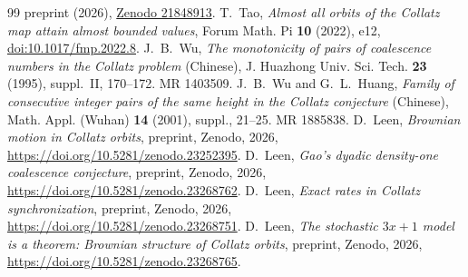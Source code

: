 \documentclass[11pt]{amsart}
\theoremstyle{definition}
\theoremstyle{remark}
\begin{document}
\begin{thebibliography}{99}
preprint (2026), \href{https://zenodo.org/records/21848913}{Zenodo 21848913}.
T.~Tao, \emph{Almost all orbits of the Collatz map attain almost bounded values},
Forum Math. Pi \textbf{10} (2022), e12,
\href{https://doi.org/10.1017/fmp.2022.8}{doi:10.1017/fmp.2022.8}.
J.~B.~Wu, \emph{The monotonicity of pairs of coalescence numbers in the Collatz problem} (Chinese),
J. Huazhong Univ. Sci. Tech. \textbf{23} (1995), suppl.~II, 170--172. MR 1403509.
J.~B.~Wu and G.~L.~Huang, \emph{Family of consecutive integer pairs of the same height in the Collatz conjecture} (Chinese),
Math. Appl. (Wuhan) \textbf{14} (2001), suppl., 21--25. MR 1885838.
D.~Leen, \emph{Brownian motion in Collatz orbits}, preprint, Zenodo, 2026,
\url{https://doi.org/10.5281/zenodo.23252395}.
D.~Leen, \emph{Gao's dyadic density-one coalescence conjecture}, preprint, Zenodo, 2026,
\url{https://doi.org/10.5281/zenodo.23268762}.
D.~Leen, \emph{Exact rates in Collatz synchronization}, preprint, Zenodo, 2026,
\url{https://doi.org/10.5281/zenodo.23268751}.
D.~Leen, \emph{The stochastic $3x+1$ model is a theorem: Brownian structure of Collatz orbits}, preprint, Zenodo, 2026,
\url{https://doi.org/10.5281/zenodo.23268765}.
\end{thebibliography}
\end{document}
